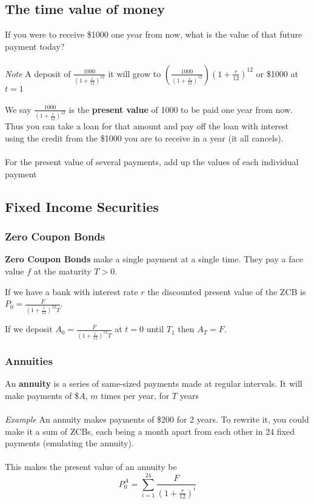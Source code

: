 \documentclass[12pt,letterpaper, twocolumn]{article}
\begin{document}
\subsection{The time value of money}
If you were to receive \$1000 one year from now, what is the value of that future payment today? 
\\\\
\textit{Note} A deposit of $\frac{1000}{(1+\frac{r}{12})^{12}}$ it will grow to $(\frac{1000}{(1+\frac{r}{12})^{12}})(1+\frac{r}{12})^{12}$ or \$1000 at $t=1$
\\\\
We say $\frac{1000}{(1+\frac{r}{12})^{12}}$ is the \textbf{present value} of 1000 to be paid one year from now. Thus you can take a loan for that amount and pay off the loan with interest using the credit from the \$1000 you are to receive in a year (it all cancels). 
\\\\
For the present value of several payments,  add up the values of each individual payment

\subsection{Fixed Income Securities}
\subsubsection{Zero Coupon Bonds}
\textbf{Zero Coupon Bonds} make a single payment at a single time. They pay a face value $f$ at the maturity $T>0$. 

If we have a bank with interest rate $r$ the discounted present value of the ZCB is $P_0 = \frac{F}{(1+\frac{r}{12})^12T}$. 

If we deposit $A_0 = \frac{F}{(1+\frac{r}{12})^12T}$ at $t=0$ until $T_1$ then $A_T = F$. 

\subsubsection{Annuities}
An \textbf{annuity} is a series of same-sized payments made at regular intervals. It will make payments of \$$A$, $m$ times per year, for $T$ years
\\\\
\textit{Example}
An annuity makes payments of \$200 for 2 years. To rewrite it, you could make it a sum of ZCBs, each being a month apart from each other in 24 fixed payments (emulating the annuity). 
\\\\
This makes the present value of an annuity be
 \[P_0^A = \sum_{i=1}^{24}\frac{F}{(1+\frac{r}{12})^i}\]
\end{document}
